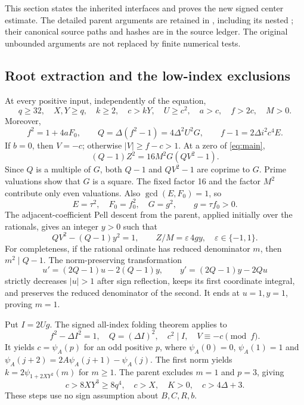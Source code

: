 \documentclass[11pt]{article}
\theoremstyle{remark}\newtheorem{remark}[theorem]{Remark}
\newcommand{\code}[1]{\texttt{\detokenize{#1}}}
\begin{document}
This section states the inherited interfaces and proves the new signed
center estimate. The detailed parent arguments are retained in
\code{compact/parents/}, including its nested \code{proof_sources/}; their canonical
source paths and hashes are in the source ledger. The original unbounded
arguments are not replaced by finite numerical tests.

\subsection{Root extraction and the low-index exclusions}

At every positive input, independently of the equation,
\[
 q\ge32,\quad X,Y\ge q,\quad k\ge2,\quad c>kY,\quad
 U\ge c^2,\quad a>c,\quad f>2c,\quad M>0.
\]
Moreover,
\begin{equation}\label{eq:strongidentities}
 f^2=1+4aF_0,\qquad
 Q=\Delta(f^2-1)=4\Delta^2U^2G,\qquad
 f-1=2\Delta i^2c^4E.
\end{equation}
If $b=0$, then $V=-c$; otherwise $|V|\ge f-c>1$. At a zero of
\eqref{eq:main},
\[
 (Q-1)Z^2=16M^2G(QV^2-1).
\]
Since $Q$ is a multiple of $G$, both $Q-1$ and $QV^2-1$ are coprime
to $G$. Prime valuations show that $G$ is a square. The fixed factor
16 and the factor $M^2$ contribute only even valuations. Also
$\gcd(E,F_0)=1$, so
\[
 E=\tau^2,\quad F_0=f_0^2,\quad G=g^2,
 \qquad g=\tau f_0>0.
\]
The adjacent-coefficient Pell descent from the parent, applied initially
over the rationals, gives an integer $y>0$ such that
\begin{equation}\label{eq:adjacent}
 QV^2-(Q-1)y^2=1,\qquad Z/M=\varepsilon\,4gy,
 \quad \varepsilon\in\{-1,1\}.
\end{equation}
For completeness, if the rational ordinate has reduced denominator $m$,
then $m^2\mid Q-1$. The norm-preserving transformation
\[
 u'=(2Q-1)u-2(Q-1)y,\qquad
 y'=(2Q-1)y-2Qu
\]
strictly decreases $|u|>1$ after sign reflection, keeps its first
coordinate integral, and preserves the reduced denominator of the second.
It ends at $u=1,y=1$, proving $m=1$.

Put $I=2Ug$. The signed all-index folding theorem applies to
\[
 f^2-\Delta I^2=1,\quad Q=(\Delta I)^2,
 \quad c^2\mid I,\quad V\equiv-c\pmod f.
\]
It yields $c=\psi_A(p)$ for an odd positive $p$, where
$\psi_A(0)=0$, $\psi_A(1)=1$ and
$\psi_A(j+2)=2A\psi_A(j+1)-\psi_A(j)$.
The first norm yields $k=2\psi_{1+2XY^2}(m)$ for $m\ge1$.
The parent excludes $m=1$ and $p=3$, giving
\[
 c>8XY^3\ge8q^4,\quad c>X,\quad K>0,
 \quad c>4\Delta+3.
\]
These steps use no sign assumption about $B,C,R,b$.
\end{document}
